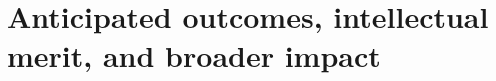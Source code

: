 \section{Anticipated outcomes, intellectual merit, and broader impact}
\label{sec:anticipated-outcomes}





